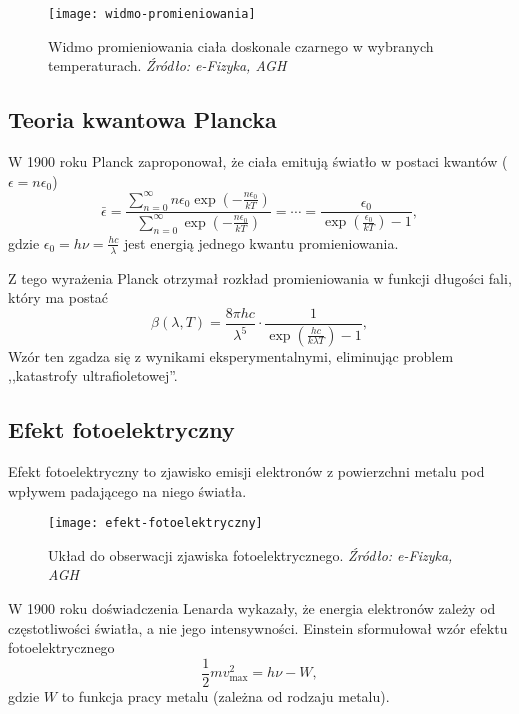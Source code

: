 \begin{figure}[H]
    \centering
    \texttt{[image: widmo-promieniowania]}
    \caption{Widmo promieniowania ciała doskonale czarnego w wybranych temperaturach. \textit{Źródło: e-Fizyka, AGH}}
    \label{fig:widmo-promieniowania}
\end{figure}

\subsection{Teoria kwantowa Plancka}
W 1900 roku Planck zaproponował, że ciała emitują światło w postaci kwantów ($\epsilon = n\epsilon_0$)
\begin{equation*}
    \bar{\epsilon} = \frac{\sum\limits_{n=0}^{\infty} n\epsilon_0 \exp(-\frac{n\epsilon_0}{kT})}{\sum\limits_{n=0}^{\infty} \exp(-\frac{n\epsilon_0}{kT})} = \cdots = \frac{\epsilon_0}{\exp(\frac{\epsilon_0}{kT}) - 1},
\end{equation*}
gdzie \(\epsilon_0 = h \nu = \frac{h c}{\lambda}\) jest energią jednego kwantu promieniowania.

Z tego wyrażenia Planck otrzymał rozkład promieniowania w funkcji długości fali, który ma postać
\begin{equation*}
    \beta(\lambda, T) = \frac{8\pi hc}{\lambda^5} \cdot \frac{1}{\exp(\frac{hc}{k\lambda T}) - 1},
\end{equation*}
Wzór ten zgadza się z wynikami eksperymentalnymi, eliminując problem ,,katastrofy ultrafioletowej''.

\subsection{Efekt fotoelektryczny}
Efekt fotoelektryczny to zjawisko emisji elektronów z powierzchni metalu pod wpływem padającego na niego światła.

\begin{figure}[H]
    \centering
    \texttt{[image: efekt-fotoelektryczny]}
    \caption{Układ do obserwacji zjawiska fotoelektrycznego. \textit{Źródło: e-Fizyka, AGH}}
    \label{fig:efekt-fotoelektryczny}
\end{figure}

W 1900 roku doświadczenia Lenarda wykazały, że energia elektronów zależy od częstotliwości światła, a nie jego intensywności.
Einstein sformułował wzór efektu fotoelektrycznego
\begin{equation*}
    \frac{1}{2} m v_{\max}^2 = h\nu - W,
\end{equation*}
gdzie $W$ to funkcja pracy metalu (zależna od rodzaju metalu).

